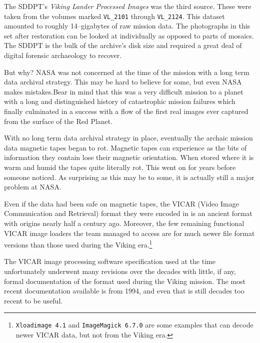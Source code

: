 The SDDPT's {\it Viking Lander Processed Images} was the third source. These were taken from the volumes marked {\tt VL_2101} through {\tt VL_2124}. This dataset amounted to roughly 14--gigabytes of raw mission data. The photographs in this set after restoration can be looked at individually as opposed to parts of mosaics. The SDDPT is the bulk of the archive's disk size and required a great deal of digital forensic archaeology to recover. 

But why? NASA was not concerned at the time of the mission with a long term data archival strategy. This may be hard to believe for some, but even NASA makes mistakes. Bear in mind that this was a very difficult mission to a planet with a long and distinguished history of catastrophic mission failures which finally culminated in a success with a flow of the first real images ever captured from the surface of the Red Planet.

    {}

With no long term data archival strategy in place, eventually the archaic mission data magnetic tapes began to rot. Magnetic tapes can experience  as the bits of information they contain lose their magnetic orientation. When stored where it is warm and humid the tapes quite literally rot. This went on for years before someone noticed. As surprising as this may be to some, it is actually still a major problem at NASA.

Even if the data had been safe on magnetic tapes, the VICAR (Video Image Communication and Retrieval) format they were encoded in is an ancient format with origins nearly half a century ago. Moreover, the few remaining functional VICAR image loaders the team managed to access are for much newer file format versions than those used during the Viking era.\footnote{{\tt Xloadimage 4.1} and {\tt ImageMagick 6.7.0} are some examples that can decode newer VICAR data, but not from the Viking era.}

The VICAR image processing software specification used at the time unfortunately underwent many revisions over the decades with little, if any, formal documentation of the format used during the Viking mission. The most recent documentation available is from 1994, and even that is still decades too recent to be useful.


